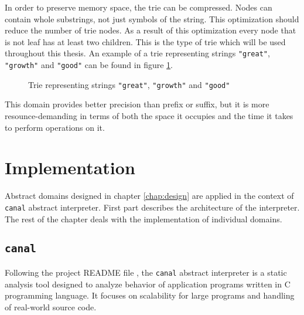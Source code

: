 \documentclass[12pt,final,oneside]{fithesis2}
\theoremstyle{definition}
\begin{document}
In order to preserve memory space, the trie can be compressed. Nodes can
contain whole substrings, not just symbols of the string. This optimization
should reduce the number of trie nodes. As a result of this optimization
every node that is not leaf has at least two children. This is the type of
trie which will be used throughout this thesis. An example of a trie
representing strings \texttt{"great"}, \texttt{"growth"} and \texttt{"good"}
can be found in figure \ref{fig:trie}.

\begin{figure}[ht]
\centering
{}
\caption{Trie representing strings \texttt{"great"}, \texttt{"growth"} and
  \texttt{"good"}}
\label{fig:trie}
\end{figure}

This domain provides better precision than prefix or suffix, but it is more
resounce-demanding in terms of both the space it occupies and the time it
takes to perform operations on it.


\chapter{Implementation}
\label{chap:implementation}

Abstract domains designed in chapter \ref{chap:design} are applied in the
context of \texttt{canal} abstract interpreter. First part describes the
architecture of the interpreter. The rest of the chapter deals with the
implementation of individual domains.


\section{\texttt{canal}}

Following the project README file \cite{Klic12-1}, the \texttt{canal}
abstract interpreter is a static analysis tool designed to analyze behavior
of application programs written in C programming language. It focuses
on scalability for large programs and handling of real-world source code.
\end{document}
